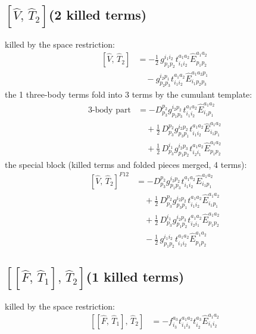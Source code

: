 \documentclass[11pt]{article}
\begin{document}
\subsection*{$\left[\hat{V},\, \hat{T}_{2}\right]$\quad(2 killed terms)}
killed by the space restriction:
\begin{align}
\left[\hat{V},\, \hat{T}_{2}\right] &= - \tfrac{1}{2}\, g^{i_{1}i_{2}}_{p_{1}p_{2}} t^{a_{1}a_{2}}_{i_{1}i_{2}} \hat{E}^{a_{1}a_{2}}_{p_{1}p_{2}} \\
&\quad - g^{i_{2}p_{1}}_{p_{2}p_{3}} t^{a_{1}a_{2}}_{i_{1}i_{2}} \hat{E}^{a_{1}a_{2}p_{1}}_{i_{1}p_{2}p_{3}}
\end{align}
the 1 three-body terms fold into 3 terms by the cumulant template:
\begin{align}
3\text{-body part} &= - D^{p_{2}}_{p_{3}} g^{i_{2}p_{2}}_{p_{1}p_{3}} t^{a_{1}a_{2}}_{i_{1}i_{2}} \hat{E}^{a_{1}a_{2}}_{i_{1}p_{1}} \\
&\quad + \tfrac{1}{2}\, D^{p_{2}}_{p_{3}} g^{i_{2}p_{2}}_{p_{3}p_{1}} t^{a_{1}a_{2}}_{i_{1}i_{2}} \hat{E}^{a_{1}a_{2}}_{i_{1}p_{1}} \\
&\quad + \tfrac{1}{2}\, D^{i_{1}}_{p_{3}} g^{i_{2}p_{3}}_{p_{1}p_{2}} t^{a_{1}a_{2}}_{i_{2}i_{1}} \hat{E}^{a_{1}a_{2}}_{p_{1}p_{2}}
\end{align}
the special block (killed terms and folded pieces merged, 4 terms):
\begin{align}
\left[\hat{V},\, \hat{T}_{2}\right]^{F12} &= - D^{p_{2}}_{p_{3}} g^{i_{2}p_{2}}_{p_{1}p_{3}} t^{a_{1}a_{2}}_{i_{1}i_{2}} \hat{E}^{a_{1}a_{2}}_{i_{1}p_{1}} \\
&\quad + \tfrac{1}{2}\, D^{p_{2}}_{p_{3}} g^{i_{2}p_{2}}_{p_{3}p_{1}} t^{a_{1}a_{2}}_{i_{1}i_{2}} \hat{E}^{a_{1}a_{2}}_{i_{1}p_{1}} \\
&\quad + \tfrac{1}{2}\, D^{i_{1}}_{p_{3}} g^{i_{2}p_{3}}_{p_{1}p_{2}} t^{a_{1}a_{2}}_{i_{2}i_{1}} \hat{E}^{a_{1}a_{2}}_{p_{1}p_{2}} \\
&\quad - \tfrac{1}{2}\, g^{i_{1}i_{2}}_{p_{1}p_{2}} t^{a_{1}a_{2}}_{i_{1}i_{2}} \hat{E}^{a_{1}a_{2}}_{p_{1}p_{2}}
\end{align}
\subsection*{$\left[\left[\hat{F},\, \hat{T}_{1}\right],\, \hat{T}_{2}\right]$\quad(1 killed terms)}
killed by the space restriction:
\begin{align}
\left[\left[\hat{F},\, \hat{T}_{1}\right],\, \hat{T}_{2}\right] &= - f^{a_{3}}_{i_{3}} t^{a_{1}a_{2}}_{i_{1}i_{3}} t^{a_{3}}_{i_{2}} \hat{E}^{a_{1}a_{2}}_{i_{1}i_{2}}
\end{align}
\end{document}
